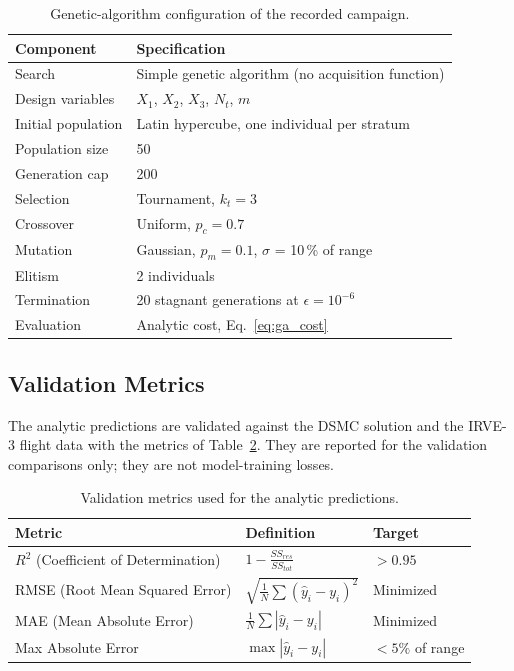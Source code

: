 \begin{table}[H]
    \centering
    \caption{Genetic-algorithm configuration of the recorded campaign.}
    \label{tab:ga_hparams}
    \begin{tabular}{|l|l|}
        \hline
        \textbf{Component} & \textbf{Specification} \\ \hline
        Search & Simple genetic algorithm (no acquisition function) \\ \hline
        Design variables & $X_1$, $X_2$, $X_3$, $N_t$, $m$ \\ \hline
        Initial population & Latin hypercube, one individual per stratum \\ \hline
        Population size & 50 \\ \hline
        Generation cap & 200 \\ \hline
        Selection & Tournament, $k_t = 3$ \\ \hline
        Crossover & Uniform, $p_c = 0.7$ \\ \hline
        Mutation & Gaussian, $p_m = 0.1$, $\sigma$ = 10\,\% of range \\ \hline
        Elitism & 2 individuals \\ \hline
        Termination & 20 stagnant generations at $\epsilon = 10^{-6}$ \\ \hline
        Evaluation & Analytic cost, Eq.~\eqref{eq:ga_cost} \\ \hline
    \end{tabular}
\end{table}

\subsection{Validation Metrics}
The analytic predictions are validated against the DSMC solution and the IRVE-3 flight data with the metrics of Table~\ref{tab:ml_metrics}. They are reported for the validation comparisons only; they are not model-training losses.

\begin{table}[H]
    \centering
    \caption{Validation metrics used for the analytic predictions.}
    \label{tab:ml_metrics}
    \begin{tabular}{|l|l|l|}
        \hline
        \textbf{Metric} & \textbf{Definition} & \textbf{Target} \\ \hline
        $R^2$ (Coefficient of Determination) & $1 - \frac{SS_{res}}{SS_{tot}}$ & $> 0.95$ \\ \hline
        RMSE (Root Mean Squared Error) & $\sqrt{\frac{1}{N}\sum(\hat{y}_i - y_i)^2}$ & Minimized \\ \hline
        MAE (Mean Absolute Error) & $\frac{1}{N}\sum|\hat{y}_i - y_i|$ & Minimized \\ \hline
        Max Absolute Error & $\max|\hat{y}_i - y_i|$ & $< 5\%$ of range \\ \hline
    \end{tabular}
\end{table}

